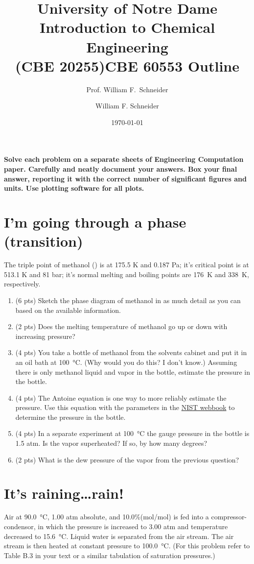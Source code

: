 \documentclass[11pt]{article}
\title{University of Notre Dame\\Introduction to Chemical Engineering\\(CBE 20255)}
\author{Prof. William F.\ Schneider}
\author{William F. Schneider}
\date{\today}
\title{CBE 60553 Outline}
\begin{document}
\begin{options}
\end{options}

\noindent \textbf{Solve each problem on a separate sheets of Engineering Computation paper.  Carefully and neatly document your answers. Box your final answer, reporting it with the correct number of significant figures and units.  Use plotting software for all plots.}


\section{I'm going through a phase (transition)}
\label{sec-1}
The triple point of methanol () is at 175.5 K and 0.187 Pa; it's critical point is at 513.1 K and 81 bar;
it's normal melting and  boiling points are \SI{176}{\kelvin} and \SI{338}{\kelvin}, respectively.

\begin{enumerate}
\item (6 pts) Sketch the phase diagram of methanol in as much detail as you can based on the available information.
\item (2 pts) Does the melting temperature of methanol go up or down with increasing pressure?
\item (4 pts) You take a bottle of methanol from the solvents cabinet and put it in an oil bath at \SI{100}{\celsius}.  (Why would you do this?  I don't know.) Assuming there is only methanol liquid and vapor in the bottle, estimate the pressure in the bottle.
\item (4 pts) The Antoine equation is one way to more reliably estimate the pressure.  Use this equation with the parameters in the \href{http://webbook.nist.gov/cgi/cbook.cgi?ID=C67561&Units=SI&Mask=4#Thermo-Phase}{NIST webbook} to determine the pressure in the bottle.
\item (4 pts) In a separate experiment at \SI{100}{\celsius} the gauge pressure in the bottle is 1.5 atm.  Is the vapor superheated?  If so, by how many degrees?
\item (2 pts) What is the dew pressure of the vapor from the previous question?
\end{enumerate}

\section{It's raining\ldots{}rain!}
\label{sec-2}
Air at \SI{90.0}{\celsius}, 1.00 atm absolute, and 10.0\%(mol/mol)  is fed into a compressor-condensor, in which the pressure is increased to 3.00 atm and temperature decreased to \SI{15.6}{\celsius}.  Liquid water is separated from the air stream.  The air stream is then heated at constant pressure to \SI{100.0}{\celsius}.  (For this problem refer to Table B.3 in your text or a similar tabulation of  saturation pressures.)
\end{document}
